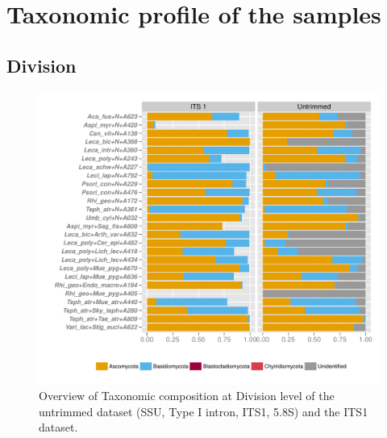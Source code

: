 \documentclass[a4paper, 11]{article}\usepackage[]{graphicx}\usepackage[]{color}
\makeatletter
\def\maxwidth{ %
  \ifdim\Gin@nat@width>\linewidth
    \linewidth
  \else
    \Gin@nat@width
  \fi
}
\newenvironment{knitrout}{}{} %
\makeatother
\begin{document}
\section{Taxonomic profile of the samples}
\subsection{Division}
\begin{knitrout}
\color{fgcolor}\begin{figure}[H]
\includegraphics[width=\maxwidth]{figure/4_divisions-1} \caption[Overview of Taxonomic composition at Division level of the untrimmed dataset (SSU, Type I intron, ITS1, 5]{Overview of Taxonomic composition at Division level of the untrimmed dataset (SSU, Type I intron, ITS1, 5.8S) and the ITS1 dataset.}\label{fig:4_divisions}
\end{figure}


\end{knitrout}
\end{document}
